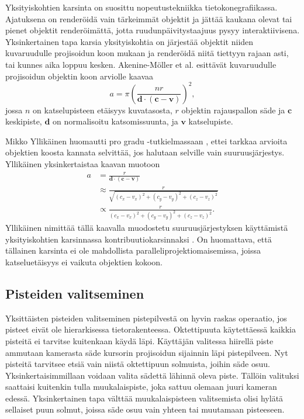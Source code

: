 Yksityiskohtien karsinta on suosittu nopeutustekniikka tietokonegrafiikassa. Ajatuksena on renderöidä vain tärkeimmät objektit ja jättää kaukana olevat tai pienet objektit renderöimättä, jotta ruudunpäivitystaajuus pysyy interaktiivisena. Yksinkertainen tapa karsia yksityiskohtia on järjestää objektit niiden kuvaruudulle projisoidun koon mukaan ja renderöidä niitä tiettyyn rajaan asti, tai kunnes aika loppuu kesken. Akenine-Möller et al. \cite{rrr} esittävät kuvaruudulle projisoidun objektin koon arviolle kaavaa 
\begin{equation}
    a = \pi (\frac{nr}{\mathbf{d} \cdot (\mathbf{c}-\mathbf{v})})^2,
\end{equation} jossa $n$ on katselupisteen etäisyys kuvatasosta, $r$ objektin rajauspallon säde ja $\mathbf{c}$ keskipiste, $\mathbf{d}$ on normalisoitu katsomissuunta, ja $\mathbf{v}$ katselupiste. \cite{mikko}

Mikko Yllikäinen huomautti pro gradu -tutkielmassaan \cite{mikko}, ettei tarkkaa arvioita objektien koosta kannata selvittää, jos halutaan selville vain suuruusjärjestys. Yllikäinen yksinkertaistaa kaavan muotoon 
\begin{equation}
    \begin{split}
    a & = \frac{r}{\mathbf{d} \cdot ( \mathbf{c} - \mathbf{v} )}\\
    & \approx \frac{r}{\sqrt{(c_x-v_x)^2 + (c_y-v_y)^2 + (c_z - v_z)^2}}\\
    & \propto \frac{r}{(c_x-v_x)^2 + (c_y-v_y)^2 + (c_z - v_z)^2}.    
    \end{split}
\end{equation}
 Yllikäinen nimittää tällä kaavalla muodostetu suuruusjärjestyksen käyttämistä yksityiskohtien karsinnassa kontribuutiokarsinnaksi . On huomattava, että tällainen karsinta ei ole mahdollista paralleliprojektiomaisemissa, joissa katseluetäisyys ei vaikuta objektien kokoon. \cite{mikko}


\subsection{Pisteiden valitseminen}

Yksittäisten pisteiden valitseminen pistepilvestä on hyvin raskas operaatio, jos pisteet eivät ole hierarkisessa tietorakenteessa. Oktettipuuta käytettäessä kaikkia pisteitä ei tarvitse kuitenkaan käydä läpi. Käyttäjän valitessa hiirellä piste ammutaan kamerasta säde kursorin projisoidun sijainnin läpi pistepilveen. Nyt pisteitä tarvitsee etsiä vain niistä oktettipuun solmuista, joihin säde osuu. Yksinkertaisimmillaan voidaan valita sädettä lähinnä oleva piste. Tällöin valituksi saattaisi kuitenkin tulla muukalaispiste, joka sattuu olemaan juuri kameran edessä. Yksinkertainen tapa välttää muukalaispisteen valitsemista olisi hylätä sellaiset puun solmut, joissa säde osuu vain yhteen tai muutamaan pisteeseen.

